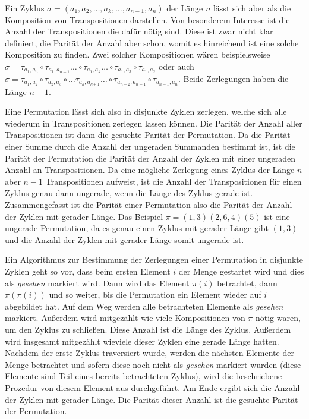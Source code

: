 \documentclass{whswinvcbook}
\begin{document}
Ein Zyklus $\sigma=(a_1,a_2,\dots,a_k,\dots,a_{n-1},a_n)$ der Länge $n$ lässt sich aber als die Komposition von Transpositionen darstellen. Von besonderem Interesse ist die Anzahl der Transpositionen die dafür nötig sind. Diese ist zwar nicht klar definiert, die Parität der Anzahl aber schon, womit es hinreichend ist eine solche Komposition zu finden. Zwei solcher Kompositionen wären beispielsweise $\sigma=\tau_{a_1,a_n}\circ\tau_{a_1,a_{n-1}}\dots\circ\tau_{a_1,a_k}\dots\circ\tau_{a_1,a_3}\circ\tau_{a_1,a_2}$ oder auch $\sigma=\tau_{a_1,a_2}\circ\tau_{a_2,a_3}\circ\dots\tau_{a_k,a_{k+1}}\dots\circ\tau_{a_{n-2},a_{n-1}}\circ\tau_{a_{n-1},a_n}$. Beide Zerlegungen haben die Länge $n-1$.

Eine Permutation lässt sich also in disjunkte Zyklen zerlegen, welche sich alle wiederum in Transpositionen zerlegen lassen können. Die Parität der Anzahl aller Transpositionen ist dann die gesuchte Parität der Permutation. Da die Parität einer Summe durch die Anzahl der ungeraden Summanden bestimmt ist, ist die Parität der Permutation die Parität der Anzahl der Zyklen mit einer ungeraden Anzahl an Transpositionen. Da eine mögliche Zerlegung eines Zyklus der Länge $n$ aber $n-1$ Transpositionen aufweist, ist die Anzahl der Transpositionen für einen Zyklus genau dann ungerade, wenn die Länge des Zyklus gerade ist. Zusammengefasst ist die Parität einer Permutation also die Parität der Anzahl der Zyklen mit gerader Länge. Das Beispiel $\pi=(1,3)(2,6,4)(5)$ ist eine ungerade Permutation, da es genau einen Zyklus mit gerader Länge gibt $(1,3)$ und die Anzahl der Zyklen mit gerader Länge somit ungerade ist.

Ein Algorithmus zur Bestimmung der Zerlegungen einer Permutation in disjunkte Zyklen geht so vor, dass beim ersten Element $i$ der Menge gestartet wird und dies als \textit{gesehen} markiert wird. Dann wird das Element $\pi(i)$ betrachtet, dann $\pi(\pi(i))$ und so weiter, bis die Permutation ein Element wieder auf $i$ abgebildet hat. Auf dem Weg werden alle betrachteten Elemente als \textit{gesehen} markiert. Außerdem wird mitgezählt wie viele Kompositionen von $\pi$ nötig waren, um den Zyklus zu schließen. Diese Anzahl ist die Länge des Zyklus. Außerdem wird insgesamt mitgezählt wieviele dieser Zyklen eine gerade Länge hatten. Nachdem der erste Zyklus traversiert wurde, werden die nächsten Elemente der Menge betrachtet und sofern diese noch nicht als \textit{gesehen} markiert wurden (diese Elemente sind Teil eines bereits betrachteten Zyklus), wird die beschriebene Prozedur von diesem Element aus durchgeführt. Am Ende ergibt sich die Anzahl der Zyklen mit gerader Länge. Die Parität dieser Anzahl ist die gesuchte Parität der Permutation.
\end{document}
